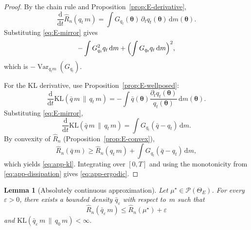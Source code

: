 \documentclass[11pt,a4paper]{article}
\newtheorem{lemma}[theorem]{Lemma}
\theoremstyle{definition}
\theoremstyle{remark}
\newcommand{\vtheta}{\boldsymbol{\theta}}
\newcommand{\dd}{\mathrm{d}}
\begin{document}
\begin{proof}
  By the chain rule and
  Proposition~\ref{prop:E-derivative},
  \[
    \frac{\dd}{\dd t}\hat R_n(q_t\,m)
    =
    \int G_{q_t}(\vtheta)\,
    \partial_t q_t(\vtheta)\,\dd m(\vtheta).
  \]
  Substituting \eqref{eq:E-mirror} gives
  \[
    -\int G_{q_t}^2 q_t\,\dd m
    + \Bigl(\int G_{q_t}q_t\,\dd m\Bigr)^2,
  \]
  which is
  \(-\operatorname{Var}_{q_t m}(G_{q_t})\).

  For the KL derivative, use
  Proposition~\ref{prop:E-wellposed}:
  \[
    \frac{\dd}{\dd t}
    \mathrm{KL}(\bar q\,m \,\|\, q_t\,m)
    =
    -\int \bar q(\vtheta)
    \frac{\partial_t q_t(\vtheta)}{q_t(\vtheta)}
    \,\dd m(\vtheta).
  \]
  Substituting \eqref{eq:E-mirror},
  \[
    \frac{\dd}{\dd t}
    \mathrm{KL}(\bar q\,m \,\|\, q_t\,m)
    =
    \int G_{q_t}(\bar q-q_t)\,\dd m.
  \]
  By convexity of \(\hat R_n\)
  (Proposition~\ref{prop:E-convex}),
  \[
    \hat R_n(\bar q\,m)
    \ge
    \hat R_n(q_t\,m)
    + \int G_{q_t}(\bar q-q_t)\,\dd m,
  \]
  which yields \eqref{eq:app-kl}. Integrating
  over \([0,T]\) and using the monotonicity from
  \eqref{eq:app-dissipation} gives
  \eqref{eq:app-ergodic}.
\end{proof}

\begin{lemma}[Absolutely continuous approximation]
  \label{lem:E-approx}
  Let \(\mu^\star \in \mathcal{P}(\Theta_E)\).
  For every \(\varepsilon>0\), there exists a
  bounded density \(\bar q_\varepsilon\) with
  respect to~\(m\) such that
  \[
    \hat R_n(\bar q_\varepsilon\,m)
    \le
    \hat R_n(\mu^\star) + \varepsilon
  \]
  and
  \(
    \mathrm{KL}(\bar q_\varepsilon\,m \,\|\, q_0\,m)
    < \infty.
  \)
\end{lemma}
\end{document}
